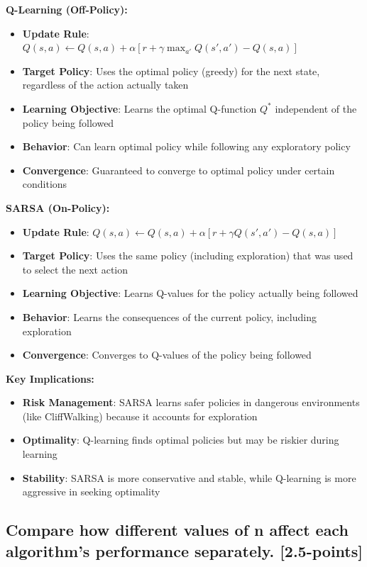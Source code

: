 \documentclass[12pt]{article}
\begin{document}
{{{\textbf{Q-Learning (Off-Policy):}
\begin{itemize}
    \item \textbf{Update Rule}: $Q(s,a) \leftarrow Q(s,a) + \alpha[r + \gamma \max_{a'} Q(s',a') - Q(s,a)]$
    \item \textbf{Target Policy}: Uses the optimal policy (greedy) for the next state, regardless of the action actually taken
    \item \textbf{Learning Objective}: Learns the optimal Q-function $Q^*$ independent of the policy being followed
    \item \textbf{Behavior}: Can learn optimal policy while following any exploratory policy
    \item \textbf{Convergence}: Guaranteed to converge to optimal policy under certain conditions
\end{itemize}

\textbf{SARSA (On-Policy):}
\begin{itemize}
    \item \textbf{Update Rule}: $Q(s,a) \leftarrow Q(s,a) + \alpha[r + \gamma Q(s',a') - Q(s,a)]$
    \item \textbf{Target Policy}: Uses the same policy (including exploration) that was used to select the next action
    \item \textbf{Learning Objective}: Learns Q-values for the policy actually being followed
    \item \textbf{Behavior}: Learns the consequences of the current policy, including exploration
    \item \textbf{Convergence}: Converges to Q-values of the policy being followed
\end{itemize}

\textbf{Key Implications:}
\begin{itemize}
    \item \textbf{Risk Management}: SARSA learns safer policies in dangerous environments (like CliffWalking) because it accounts for exploration
    \item \textbf{Optimality}: Q-learning finds optimal policies but may be riskier during learning
    \item \textbf{Stability}: SARSA is more conservative and stable, while Q-learning is more aggressive in seeking optimality
\end{itemize}

\subsection{Compare how different values of n affect each algorithm's performance separately. [2.5-points]}

}}}
\end{document}
